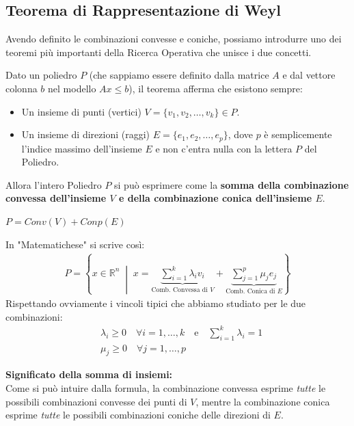 \documentclass[12pt, a4paper]{article}
\newcommand{\separatore}{\noindent{\color{titlecolor!50}\rule{\textwidth}{0.6pt}}}
\begin{document}
	\vspace{0.8cm}
	\separatore
	\vspace{0.3cm}
	
	\subsection*{Teorema di Rappresentazione di Weyl}
	
	Avendo definito le combinazioni convesse e coniche, possiamo introdurre uno dei teoremi più importanti della Ricerca Operativa che unisce i due concetti.
	
	Dato un poliedro $P$ (che sappiamo essere definito dalla matrice $A$ e dal vettore colonna $b$ nel modello $Ax \leq b$), il teorema afferma che esistono sempre:
	\begin{itemize}
		\item Un insieme di punti (vertici) $V = \{v_1, v_2, \dots, v_k\} \in P$.
		\item Un insieme di direzioni (raggi) $E = \{e_1, e_2, \dots, e_p\}$, dove $p$ è semplicemente l'indice massimo dell'insieme $E$ e non c'entra nulla con la lettera $P$ del Poliedro.
	\end{itemize}
	
	Allora l'intero Poliedro $P$ si può esprimere come la \textbf{somma della combinazione convessa dell'insieme $V$ e della combinazione conica dell'insieme $E$}.
	
	$P=Conv(V)+Conp(E)$
	
	In "Matematichese" si scrive così:
	\[
	\begin{aligned}
		P = \left\{ x \in \mathbb{R}^n \;\middle|\; x = \underbrace{\sum_{i=1}^k \lambda_i v_i}_{\text{Comb. Convessa di } V} + \underbrace{\sum_{j=1}^p \mu_j e_j}_{\text{Comb. Conica di } E} \right\}
	\end{aligned}
	\]
	Rispettando ovviamente i vincoli tipici che abbiamo studiato per le due combinazioni:
	\[
	\begin{aligned}
		& \lambda_i \geq 0 \quad \forall i = 1, \dots, k \quad \text{e} \quad \sum_{i=1}^k \lambda_i = 1 \\
		& \mu_j \geq 0 \quad \forall j = 1, \dots, p
	\end{aligned}
	\]
	
	\vspace{0.3cm}
	\textbf{Significato della somma di insiemi:}\\
	Come si può intuire dalla formula, la combinazione convessa esprime \textit{tutte} le possibili combinazioni convesse dei punti di $V$, mentre la combinazione conica esprime \textit{tutte} le possibili combinazioni coniche delle direzioni di $E$. 
	
\end{document}
